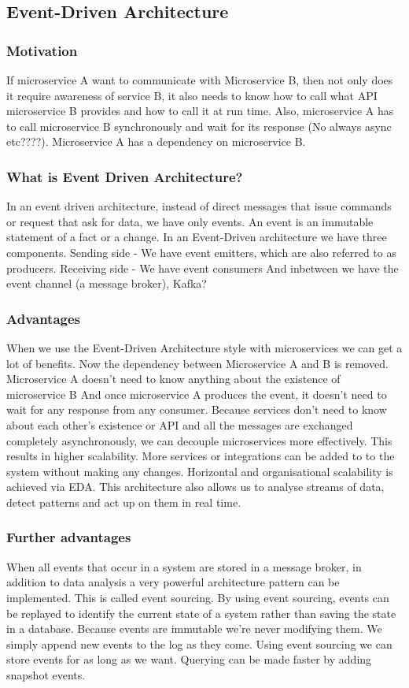\subsection{Event-Driven Architecture}

\subsubsection{Motivation}
If microservice A want to communicate with Microservice B, then not only does it require awareness of service B, it also needs to know how to call what API microservice B provides and how to call it at run time.
Also, microservice A has to call microservice B synchronously and wait for its response (No always async etc????).
Microservice A has a dependency on microservice B\@.

\subsubsection{What is Event Driven Architecture?}
In an event driven architecture, instead of direct messages that issue commands or request that ask for data, we have only events.
An event is an immutable statement of a fact or a change.
In an Event-Driven architecture we have three components.
Sending side - We have event emitters, which are also referred to as producers.
Receiving side - We have event consumers
And inbetween we have the event channel (a message broker), Kafka?

\subsubsection{Advantages}
When we use the Event-Driven Architecture style with microservices we can get a lot of benefits.
Now the dependency between Microservice A and B is removed.
Microservice A doesn't need to know anything about the existence of microservice B
And once microservice A produces the event, it doesn't need to wait for any response from any consumer.
Because services don't need to know about each other's existence or API and all the messages are exchanged completely asynchronously, we can decouple microservices more effectively.
This results in higher scalability.
More services or integrations can be added to to the system without making any changes.
Horizontal and organisational scalability is achieved via EDA.
This architecture also allows us to analyse streams of data, detect patterns and act up on them in real time.

\subsubsection{Further advantages}
When all events that occur in a system are stored in a message broker, in addition to data analysis a very powerful architecture pattern can be implemented.
This is called event sourcing.
By using event sourcing, events can be replayed to identify the current state of a system rather than saving the state in a database.
Because events are immutable we're never modifying them.
We simply append new events to the log as they come.
Using event sourcing we can store events for as long as we want.
Querying can be made faster by adding snapshot events.

